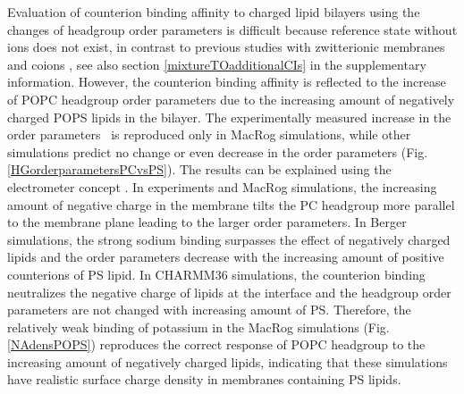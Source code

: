 \documentclass[aps,prl,superscriptaddress,twocolumn]{revtex4}
\begin{document}
Evaluation of counterion binding affinity to charged lipid bilayers
using the changes of headgroup order parameters is difficult because
reference state without ions does not exist, in contrast to previous
studies with zwitterionic membranes and coions \cite{catte16},
see also section \ref{mixtureTOadditionalCIs} in the supplementary information.
However, the counterion binding affinity is
reflected to the increase of POPC headgroup order parameters due to the
increasing amount of negatively charged POPS lipids in the bilayer.
The experimentally measured increase in the order parameters~\cite{scherer87}
is reproduced only in MacRog simulations, while other simulations
predict no change or even decrease in the order parameters (Fig. \ref{HGorderparametersPCvsPS}).
The results can be explained using the electrometer concept \cite{seelig87,scherer89}.
In experiments and MacRog simulations, the increasing amount of negative charge
in the membrane tilts the PC headgroup more parallel to the membrane plane
leading to the larger order parameters. In Berger simulations,
the strong sodium binding surpasses the effect of negatively charged
lipids and the order parameters decrease with the increasing amount of
positive counterions of PS lipid.
In CHARMM36 simulations, the counterion binding neutralizes the negative charge
of lipids at the interface and the headgroup order parameters are not changed
with increasing amount of PS. Therefore, the relatively weak binding of potassium
in the MacRog simulations (Fig. \ref{NAdensPOPS}) reproduces the correct
response of POPC headgroup to the increasing amount of negatively charged lipids,
indicating that these simulations have realistic surface charge density in membranes
containing PS lipids.
\end{document}
